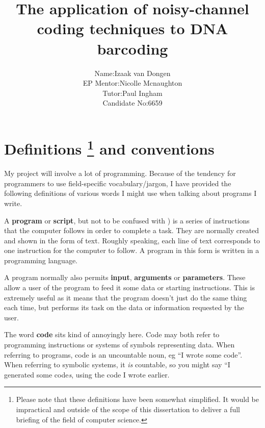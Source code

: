 \documentclass[a4paper,11pt]{article}
\title{The application of noisy-channel coding techniques to DNA barcoding}
\author{\begin{tabular}{rl}
                Name:& Izaak van Dongen\\
           EP Mentor:& Nicolle Mcnaughton\\
               Tutor:& Paul Ingham\\
        Candidate No:&  6659\\
        \end{tabular}
        }
\begin{document}
    \maketitle\thispagestyle{empty} %
    \tableofcontents
    \listoflistings
    \listoffigures
    \listoftables


    \section[Definitions and conventions]{Definitions \footnote{Please note that
    these definitions have been somewhat simplified. It would be impractical and
    outside of the scope of this dissertation to deliver a full briefing of
    the field of computer science.} and conventions}

    My project will involve a lot of programming. Because of the tendency for
    programmers to use field-specific vocabulary/jargon, I have provided the
    following definitions of various words I might use when talking about
    programs I write.

    \begin{definition}
    A \textbf{program} or \textbf{script}, but not to be
    confused with ) is a series of
    instructions that the computer follows in order to complete a task. They are
    normally created and shown in the form of text. Roughly speaking, each line
    of text corresponds to one instruction for the computer to follow. A program
    in this form is written in a programming language.
    \end{definition}

    \begin{definition}
    A program normally also permits \textbf{input}, \textbf{arguments} or
    \textbf{parameters}. These allow a user of the program to feed it some data
    or starting instructions. This is extremely useful as it means that the
    program doesn't just do the same thing each time, but performs its task on
    the data or information requested by the user.
    \end{definition}

    \begin{definition}
    The word \textbf{code} sits kind of annoyingly here. Code may both refer to
    programming instructions or systems of symbols representing data. When
    referring to programs, code is an uncountable noun, eg ``I wrote some
    code''. When referring to symbolic systems, it \textit{is} countable, so you
    might say ``I generated some code\textit{s}, using the code I wrote earlier.
    \end{definition}
\end{document}
